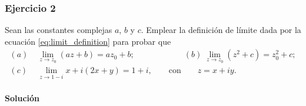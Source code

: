 \documentclass[a4paper]{report}
\begin{document}
\subsubsection{Ejercicio 2}

Sean las constantes complejas \(a\), \(b\) y \(c\). Emplear la definición de límite dada por la ecuación \ref{eq:limit_definition} para probar que 
\begin{align*}
 (\textit{a})\;&\lim_{z\to z_0}(az+b)=az_0+b;\qquad\qquad\qquad
 (\textit{b})\;\lim_{z\to z_0}(z^2+c)=z_0^2+c;\\
 (\textit{c})\;&\lim_{z\to1-i}x+i(2x+y)=1+i,\qquad\textrm{con}\qquad z=x+iy.
\end{align*}

\paragraph{Solución} 
\end{document}
